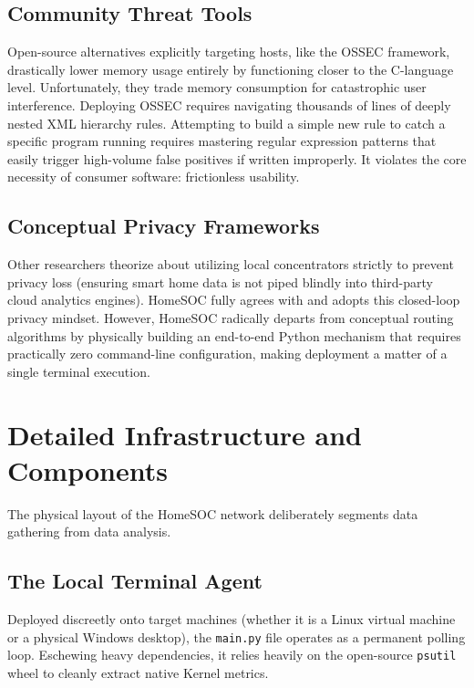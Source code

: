 \documentclass[conference]{IEEEtran}
\begin{document}
\subsection{Community Threat Tools}
Open-source alternatives explicitly targeting hosts, like the OSSEC framework, drastically lower memory usage entirely by functioning closer to the C-language level. Unfortunately, they trade memory consumption for catastrophic user interference. Deploying OSSEC requires navigating thousands of lines of deeply nested XML hierarchy rules. Attempting to build a simple new rule to catch a specific program running requires mastering regular expression patterns that easily trigger high-volume false positives if written improperly. It violates the core necessity of consumer software: frictionless usability.

\subsection{Conceptual Privacy Frameworks}
Other researchers theorize about utilizing local concentrators strictly to prevent privacy loss (ensuring smart home data is not piped blindly into third-party cloud analytics engines). HomeSOC fully agrees with and adopts this closed-loop privacy mindset. However, HomeSOC radically departs from conceptual routing algorithms by physically building an end-to-end Python mechanism that requires practically zero command-line configuration, making deployment a matter of a single terminal execution.

\section{Detailed Infrastructure and Components}

The physical layout of the HomeSOC network deliberately segments data gathering from data analysis. 

\subsection{The Local Terminal Agent}
Deployed discreetly onto target machines (whether it is a Linux virtual machine or a physical Windows desktop), the \verb|main.py| file operates as a permanent polling loop. Eschewing heavy dependencies, it relies heavily on the open-source \verb|psutil| wheel to cleanly extract native Kernel metrics. 
\end{document}
